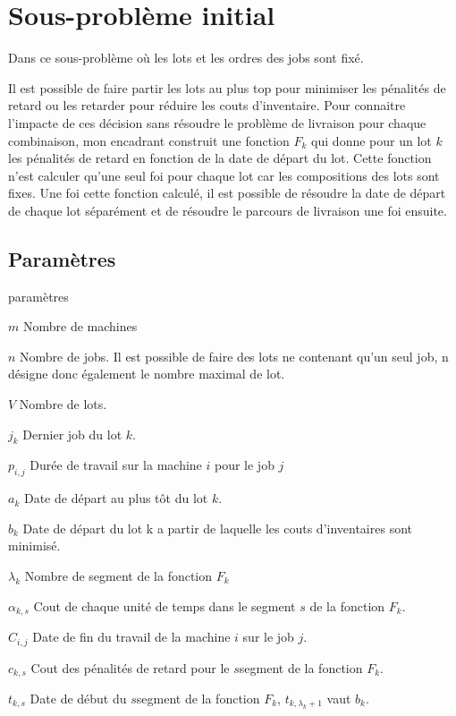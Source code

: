 \chapter{Sous-problème initial}

\label{appendix:modelisation_initiale}

Dans ce sous-problème où les lots et les ordres des jobs sont fixé.

Il est possible de faire partir les lots au plus top pour minimiser les pénalités de retard ou les retarder pour réduire les couts d'inventaire.
Pour connaitre l'impacte de ces décision sans résoudre le problème de livraison pour chaque combinaison,
mon encadrant construit une fonction $F_k$ qui donne pour un lot $k$ les pénalités de retard en fonction de la date de départ du lot.
Cette fonction n'est calculer qu'une seul foi pour chaque lot car les compositions des lots sont fixes.
Une foi cette fonction calculé, il est possible de résoudre la date de départ de chaque lot séparément et de résoudre le parcours de livraison une foi ensuite.

\section{Paramètres}
\begin{labeling}{paramètres}
	\item [$m$]
	Nombre de machines
	\item [$n$]
	Nombre de jobs.
	Il est possible de faire des lots ne contenant qu’un seul job,
	n désigne donc également le nombre maximal de lot.
	\item [$V$]
	Nombre de lots.
	\item [$j_k$]
	Dernier job du lot $k$.
	\item [$p_{i, j}$]
	Durée de travail sur la machine $i$ pour le job $j$
	\item [$a_k$]
	Date de départ au plus tôt du lot $k$.
	\item [$b_k$]
	Date de départ du lot k a partir de laquelle les couts d'inventaires sont minimisé.
	\item [$\lambda_k$]
	Nombre de segment de la fonction $F_k$
	\item [$\alpha_{k, s}$]
	Cout de chaque unité de temps dans le segment $s$ de la fonction $F_k$.
	\item [$C_{i, j}$]
	Date de fin du travail de la machine $i$ sur le job $j$.
	\item [$c_{k, s}$]
	Cout des pénalités de retard pour le $s$\ieme segment de la fonction $F_k$.
	\item [$t_{k, s}$]
	Date de début du $s$\ieme segment de la fonction $F_k$, $t_{k, \lambda_k+1}$ vaut $b_k$.
\end{labeling}


